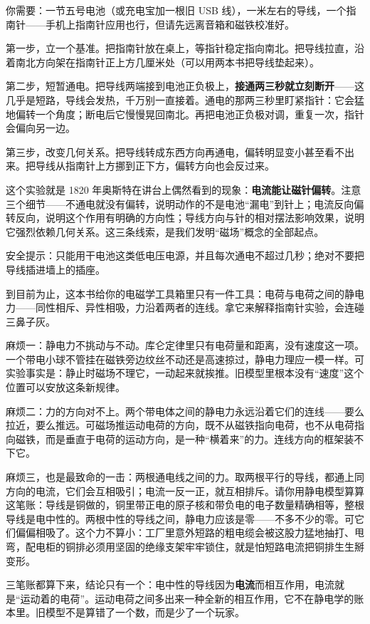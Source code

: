 
\begin{experiment}
你需要：一节五号电池（或充电宝加一根旧 USB 线），一米左右的导线，一个指南针——手机上指南针应用也行，但请先远离音箱和磁铁校准好。

第一步，立一个基准。把指南针放在桌上，等指针稳定指向南北。把导线拉直，沿着南北方向架在指南针正上方几厘米处（可以用两本书把导线垫起来）。

第二步，短暂通电。把导线两端接到电池正负极上，\textbf{接通两三秒就立刻断开}——这几乎是短路，导线会发热，千万别一直接着。通电的那两三秒里盯紧指针：它会猛地偏转一个角度；断电后它慢慢晃回南北。再把电池正负极对调，重复一次，指针会偏向另一边。

第三步，改变几何关系。把导线转成东西方向再通电，偏转明显变小甚至看不出来。把导线从指南针上方挪到正下方，偏转方向也会反过来。

这个实验就是 1820 年奥斯特在讲台上偶然看到的现象：\textbf{电流能让磁针偏转}。注意三个细节——不通电就没有偏转，说明动作的不是电池“漏电”到针上；电流反向偏转反向，说明这个作用有明确的方向性；导线方向与针的相对摆法影响效果，说明它强烈依赖几何关系。这三条线索，是我们发明“磁场”概念的全部起点。

安全提示：只能用干电池这类低电压电源，并且每次通电不超过几秒；绝对不要把导线插进墙上的插座。
\end{experiment}


\begin{mainline}
到目前为止，这本书给你的电磁学工具箱里只有一件工具：电荷与电荷之间的静电力——同性相斥、异性相吸，力沿着两者的连线。拿它来解释指南针实验，会连碰三鼻子灰。

麻烦一：静电力不挑动与不动。库仑定律里只有电荷量和距离，没有速度这一项。一个带电小球不管挂在磁铁旁边纹丝不动还是高速掠过，静电力理应一模一样。可实验事实是：静止时磁场不理它，一动起来就挨推。旧模型里根本没有“速度”这个位置可以安放这条新规律。

麻烦二：力的方向对不上。两个带电体之间的静电力永远沿着它们的连线——要么拉近，要么推远。可磁场推运动电荷的方向，既不从磁铁指向电荷，也不从电荷指向磁铁，而是垂直于电荷的运动方向，是一种“横着来”的力。连线方向的框架装不下它。

麻烦三，也是最致命的一击：两根通电线之间的力。取两根平行的导线，都通上同方向的电流，它们会互相吸引；电流一反一正，就互相排斥。请你用静电模型算算这笔账：导线是铜做的，铜里带正电的原子核和带负电的电子数量精确相等，整根导线是电中性的。两根中性的导线之间，静电力应该是零——不多不少的零。可它们偏偏相吸了。这个力不算小：工厂里意外短路的粗电缆会被这股力猛地抽打、甩弯，配电柜的铜排必须用坚固的绝缘支架牢牢锁住，就是怕短路电流把铜排生生掰变形。

三笔账都算下来，结论只有一个：电中性的导线因为\textbf{电流}而相互作用，电流就是“运动着的电荷”。运动电荷之间多出来一种全新的相互作用，它不在静电学的账本里。旧模型不是算错了一个数，而是少了一个玩家。
\end{mainline}

